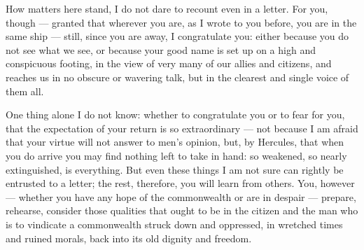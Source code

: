 

 How matters here stand, I do not dare to recount even in a letter. For you, though --- granted that wherever you are, as I wrote to you before, you are in the same ship --- still, since you are away, I congratulate you: either because you do not see what we see, or because your good name is set up on a high and conspicuous footing, in the view of very many of our allies and citizens, and reaches us in no obscure or wavering talk, but in the clearest and single voice of them all.

 One thing alone I do not know: whether to congratulate you or to fear for you, that the expectation of your return is so extraordinary --- not because I am afraid that your virtue will not answer to men's opinion, but, by Hercules, that when you do arrive you may find nothing left to take in hand: so weakened, so nearly extinguished, is everything. But even these things I am not sure can rightly be entrusted to a letter; the rest, therefore, you will learn from others. You, however --- whether you have any hope of the commonwealth or are in despair --- prepare, rehearse, consider those qualities that ought to be in the citizen and the man who is to vindicate a commonwealth struck down and oppressed, in wretched times and ruined morals, back into its old dignity and freedom.
